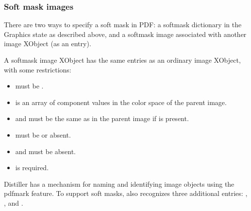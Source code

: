 \documentclass[letterpaper,12pt,english,openany,oneside]{sphinxmanual}
\begin{document}
\subsubsection{Soft mask images}
\label{\detokenize{pdfmark_Basic:soft-mask-images}}
There are two ways to specify a soft mask in PDF: a soft\sphinxhyphen{}mask dictionary in the Graphics state as described above, and a soft\sphinxhyphen{}mask image associated with another image XObject (as an  entry).

A soft\sphinxhyphen{}mask image XObject has the same entries as an ordinary image XObject, with some restrictions:
\begin{itemize}
\item {} 
 must be  .

\item {} 
 is an array of component values in the color space of the parent image.

\item {} 
 and  must be the same as in the parent image if  is present.

\item {} 
 must be  or absent.

\item {} 
 and  must be absent.

\item {} 
 is required.

\end{itemize}

Distiller has a mechanism for naming and identifying image objects using the  pdfmark feature. To support soft masks,  also recognizes three additional entries:  ,  , and  .

\end{document}
